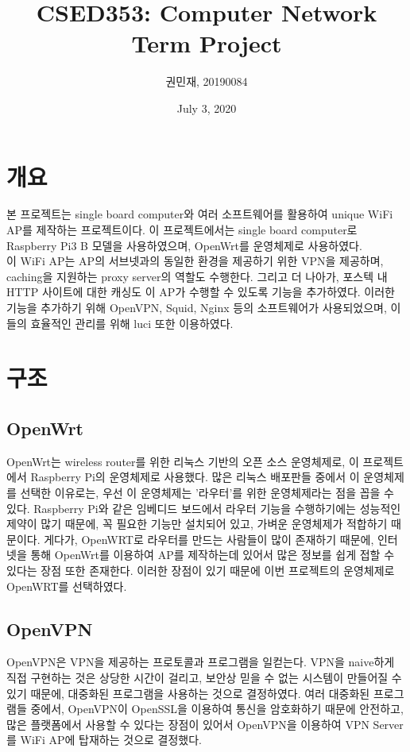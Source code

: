 \documentclass{article}
\begin{document}
    \author{\large 권민재, 20190084}
    \title{\Large\textbf{CSED353: Computer Network Term Project}}
    \date{\small July 3, 2020}
    \maketitle
    \newpage

    \tableofcontents

    \newpage
    \section{개요}
    본 프로젝트는 single board computer와 여러 소프트웨어를 활용하여 unique WiFi AP를 제작하는 프로젝트이다.
    이 프로젝트에서는 single board computer로 Raspberry Pi3 B 모델을 사용하였으며, OpenWrt를 운영체제로 사용하였다. \\
    이 WiFi AP는 AP의 서브넷과의 동일한 환경을 제공하기 위한 VPN을 제공하며, caching을 지원하는 proxy server의 역할도 수행한다.
    그리고 더 나아가, 포스텍 내 HTTP 사이트에 대한 캐싱도 이 AP가 수행할 수 있도록 기능을 추가하였다.
    이러한 기능을 추가하기 위해 OpenVPN, Squid, Nginx 등의 소프트웨어가 사용되었으며, 이들의 효율적인 관리를 위해 luci 또한 이용하였다.


    \section{구조}

    \subsection{OpenWrt}
    OpenWrt는 wireless router를 위한 리눅스 기반의 오픈 소스 운영체제로, 이 프로젝트에서 Raspberry Pi의 운영체제로 사용했다.
    많은 리눅스 배포판들 중에서 이 운영체제를 선택한 이유로는, 우선 이 운영체제는 '라우터'를 위한 운영체제라는 점을 꼽을 수 있다.
    Raspberry Pi와 같은 임베디드 보드에서 라우터 기능을 수행하기에는 성능적인 제약이 많기 때문에,
    꼭 필요한 기능만 설치되어 있고, 가벼운 운영체제가 적합하기 때문이다. 게다가, OpenWRT로 라우터를 만드는 사람들이 많이 존재하기 때문에,
    인터넷을 통해 OpenWrt를 이용하여 AP를 제작하는데 있어서 많은 정보를 쉽게 접할 수 있다는 장점 또한 존재한다.
    이러한 장점이 있기 때문에 이번 프로젝트의 운영체제로 OpenWRT를 선택하였다.
    \subsection{OpenVPN}
    OpenVPN은 VPN을 제공하는 프로토콜과 프로그램을 일컫는다.
    VPN을 naive하게 직접 구현하는 것은 상당한 시간이 걸리고, 보안상 믿을 수 없는 시스템이 만들어질 수 있기 때문에,
    대중화된 프로그램을 사용하는 것으로 결정하였다. 여러 대중화된 프로그램들 중에서,
    OpenVPN이 OpenSSL을 이용하여 통신을 암호화하기 때문에 안전하고, 많은 플랫폼에서 사용할 수 있다는 장점이 있어서
    OpenVPN을 이용하여 VPN Server를 WiFi AP에 탑재하는 것으로 결정했다.
\end{document}
